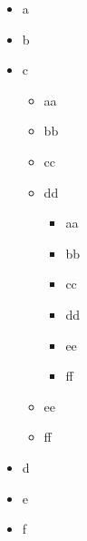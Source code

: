 \documentclass[12pt,ngerman,parskip=half]{scrartcl}
\begin{document}
\blindtext


\begin{itemize}
	\item a
	\item b
	\item c
\begin{itemize}
	\item aa
	\item bb
	\item cc
	\item dd 
	
	\begin{itemize}
	\item aa
	\item bb
	\item cc
	\item dd
	\item ee
	\item ff
\end{itemize}
	
	
	\item ee
	\item ff
\end{itemize}
	\item d
	\item e
	\item f
\end{itemize}

\blindtext
\end{document}
